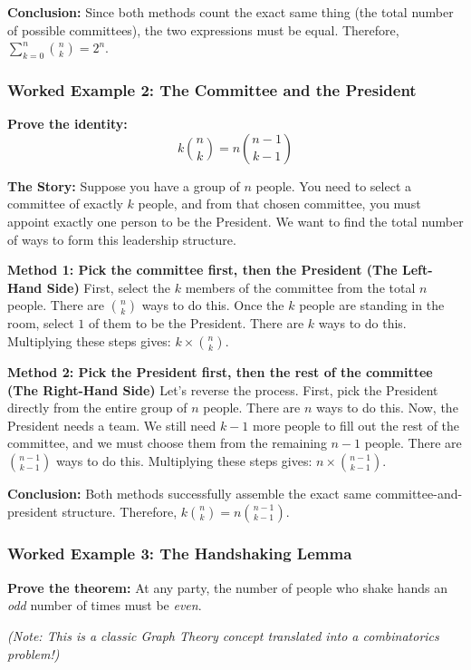 \documentclass[12pt]{article}
\begin{document}
\textbf{Conclusion:}
Since both methods count the exact same thing (the total number of possible committees), the two expressions must be equal. Therefore, $\sum_{k=0}^{n} \binom{n}{k} = 2^n$.

\subsubsection*{Worked Example 2: The Committee and the President}

\textbf{Prove the identity:}
\[
k\binom{n}{k} = n\binom{n-1}{k-1}
\]

\textbf{The Story:}
Suppose you have a group of $n$ people. You need to select a committee of exactly $k$ people, and from that chosen committee, you must appoint exactly one person to be the President. We want to find the total number of ways to form this leadership structure.

\textbf{Method 1: Pick the committee first, then the President (The Left-Hand Side)}
First, select the $k$ members of the committee from the total $n$ people. There are $\binom{n}{k}$ ways to do this.
Once the $k$ people are standing in the room, select $1$ of them to be the President. There are $k$ ways to do this.
Multiplying these steps gives: $k \times \binom{n}{k}$.

\textbf{Method 2: Pick the President first, then the rest of the committee (The Right-Hand Side)}
Let's reverse the process. First, pick the President directly from the entire group of $n$ people. There are $n$ ways to do this.
Now, the President needs a team. We still need $k-1$ more people to fill out the rest of the committee, and we must choose them from the remaining $n-1$ people. There are $\binom{n-1}{k-1}$ ways to do this.
Multiplying these steps gives: $n \times \binom{n-1}{k-1}$.

\textbf{Conclusion:}
Both methods successfully assemble the exact same committee-and-president structure. Therefore, $k\binom{n}{k} = n\binom{n-1}{k-1}$.

\subsubsection*{Worked Example 3: The Handshaking Lemma}

\textbf{Prove the theorem:}
At any party, the number of people who shake hands an \textit{odd} number of times must be \textit{even}.

\textit{(Note: This is a classic Graph Theory concept translated into a combinatorics problem!)}
\end{document}
